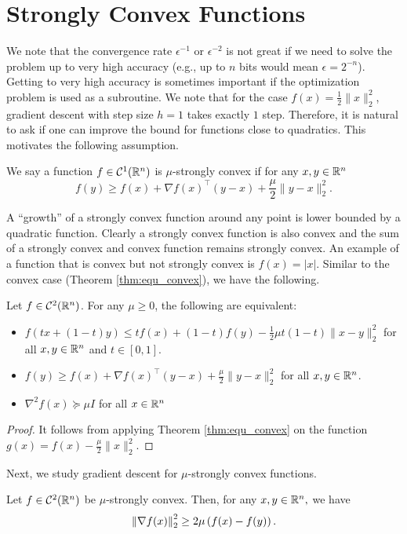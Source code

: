\section{Strongly Convex Functions}

We note that the convergence rate $\epsilon^{-1}$ or $\epsilon^{-2}$
is not great if we need to solve the problem up to very high accuracy
(e.g., up to $n$ bits would mean $\epsilon=2^{-n}$). Getting to
very high accuracy is sometimes important if the optimization problem
is used as a subroutine. We note that for the case $f(x)=\frac{1}{2}\|x\|^{2}_{2}$,
gradient descent with step size $h=1$ takes exactly $1$ step. Therefore,
it is natural to ask if one can improve the bound for functions close
to quadratics. This motivates the following assumption.
\begin{defn}
We say a function $f\in\mathcal{C}^{1}(\mathbb{R}^{n})$ is $\mu$-strongly convex
if for any $x,y\in\mathbb{R}^{n}$ 
\[
f(y)\geq f(x)+\nabla f(x)^{\top}(y-x)+\frac{\mu}{2}\|y-x\|^{2}_{2}.
\]
\end{defn}

A ``growth'' of a strongly convex function around any point is lower
bounded by a quadratic function. Clearly a strongly convex function
is also convex and the sum of a strongly convex and convex function
remains strongly convex. An example of a function that is convex but
not strongly convex is $f(x)=\left|x\right|$. Similar to the convex
case (Theorem \ref{thm:equ_convex}), we have the following.
\begin{thm}
Let $f\in\mathcal{C}^{2}(\mathbb{R}^{n})$. For any $\mu\geq0$, the following
are equivalent:
\begin{itemize}
\item $f(tx+(1-t)y)\leq tf(x)+(1-t)f(y)-\frac{1}{2}\mu t(1-t)\|x-y\|^{2}_{2}$
for all $x,y\in\mathbb{R}^{n}$ and $t\in[0,1]$.
\item $f(y)\geq f(x)+\nabla f(x)^{\top}(y-x)+\frac{\mu}{2}\|y-x\|^{2}_{2}$
for all $x,y\in\mathbb{R}^{n}$.
\item $\nabla^{2}f(x)\succeq\mu I$ for all $x\in\mathbb{R}^{n}$
\end{itemize}
\end{thm}

\begin{proof}
It follows from applying Theorem \ref{thm:equ_convex} on the function
$g(x)=f(x)-\frac{\mu}{2}\|x\|^{2}_{2}$.
\end{proof}
Next, we study gradient descent for $\mu$-strongly convex functions.
\begin{lem}
\label{lem:strongly_convex}Let $f\in\mathcal{C}^{2}(\mathbb{R}^{n})$ be
$\mu$-strongly convex. Then, for any $x,y\in\mathbb{R}^{n},$ we have
\[
\left\Vert \nabla f(x)\right\Vert^{2}_{2}\ge2\mu\left(f(x)-f(y)\right).
\]
\end{lem}

